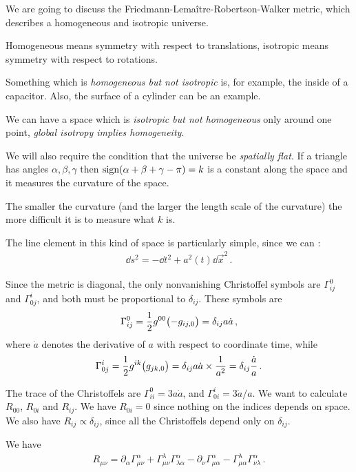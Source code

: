 \documentclass[main.tex]{subfiles}
\begin{document}
We are going to discuss the Friedmann-Lemaître-Robertson-Walker metric, which describes a homogeneous and isotropic universe. 

Homogeneous means symmetry with respect to translations, isotropic means symmetry with respect to rotations. 

Something which is \emph{homogeneous but not isotropic} is, for example, the inside of a capacitor. Also, the surface of a cylinder can be an example. 

We can have a space which is \emph{isotropic but not homogeneous} only around one point, \emph{global isotropy implies homogeneity}. 

We will also require the condition that the universe be \emph{spatially flat}. 
If a triangle has angles \(\alpha , \beta , \gamma \) then \(\text{sign} ( \alpha + \beta +\gamma -\pi ) = k\) is a constant along the space and it measures the curvature of the space. 

The smaller the curvature (and the larger the length scale of the curvature) the more difficult it is to measure what \(k\) is. 

The line element in this kind of space is particularly simple, since we can : 
%
\begin{align}
  \dd{s^2} = - \dd{t^2} + a^2(t) \dd{\vec{x}^2}
\,.
\end{align}

Since the metric is diagonal, the only nonvanishing Christoffel symbols are \(\Gamma^{0}_{ij}\) and \(\Gamma^{i}_{0j}\), and both must be proportional to \(\delta_{ij}\). 
These symbols are
%
\begin{align}
  \Gamma^{0}_{ij} = \frac{1}{2} g^{00} \qty(-g_{ij,0}) = \delta_{ij} a \dot{a}
\,,
\end{align}
%
where \(\dot{a}\) denotes the derivative of \(a\) with respect to coordinate time, while 
%
\begin{align}
  \Gamma^{i}_{0j} = \frac{1}{2} g^{ik} \qty(g_{jk,0}) = \delta_{ij} a \dot{a} \times \frac{1}{a^2} = \delta_{ij} \frac{\dot{a}}{a}
\,.
\end{align}

The trace of the Christoffels are \(\Gamma^{0}_{ii} = 3a \dot{a}\), and \(\Gamma^{i}_{0i} = 3 \dot{a} / a\). We want to calculate \(R_{00} \), \(R_{0i}\) and \(R_{ij}\). 
We have \(R_{0i} = 0\) since nothing on the indices depends on space. We also have \(R_{ij} \propto \delta_{ij}\), since all the Christoffels depend only on \(\delta_{ij}\). 

We have 
%
\begin{align}
  R_{\mu \nu } = \partial_{\alpha} \Gamma^{\alpha }_{ \mu \nu } + \Gamma^{\lambda }_{\mu \nu } \Gamma^{\alpha }_{\lambda \alpha } - \partial_{\nu }\Gamma^{\alpha }_{\mu \alpha } - \Gamma^{\lambda }_{\mu \alpha } \Gamma^{\alpha }_{\nu \lambda }
\,.
\end{align}
\end{document}
